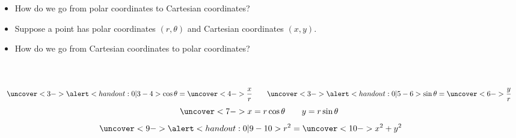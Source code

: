 \begin{frame}
\begin{itemize}
\item  How do we go from polar coordinates to Cartesian coordinates?
\item<2->  Suppose a point has polar coordinates $(r, \theta )$ and Cartesian coordinates $(x,y)$.
\item<8->  How do we go from Cartesian coordinates to polar coordinates?
\end{itemize}
\begin{columns}[c]
\ %
\[
\uncover<3->{%
\alert<handout:0| 3-4>{\cos\theta = \uncover<4->{\frac{x}{r}}}\qquad %
}%
\uncover<3->{%
\alert<handout:0| 5-6>{\sin\theta = \uncover<6->{\frac{y}{r}}}%
}%
\]
\[
\uncover<7->{%
x = r\cos \theta \qquad y = r\sin \theta
}%
\]
\[
\uncover<9->{%
\alert<handout:0| 9-10>{r^2 = \uncover<10->{x^2 + y^2}}\qquad %
}%
\]
\end{columns}
\end{frame}
